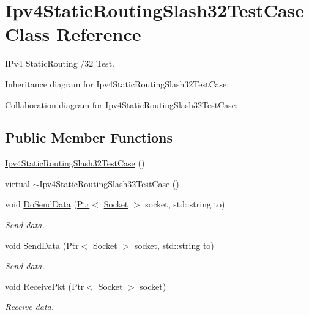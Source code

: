 \hypertarget{classIpv4StaticRoutingSlash32TestCase}{}\section{Ipv4\+Static\+Routing\+Slash32\+Test\+Case Class Reference}
\label{classIpv4StaticRoutingSlash32TestCase}


I\+Pv4 Static\+Routing /32 Test.  




Inheritance diagram for Ipv4\+Static\+Routing\+Slash32\+Test\+Case\+:


Collaboration diagram for Ipv4\+Static\+Routing\+Slash32\+Test\+Case\+:
\subsection*{Public Member Functions}
\begin{DoxyCompactItemize}
\item 
\hyperlink{classIpv4StaticRoutingSlash32TestCase_a933154d0475b7d7adbd5bb585c1a8ac0}{Ipv4\+Static\+Routing\+Slash32\+Test\+Case} ()
\item 
virtual \hyperlink{classIpv4StaticRoutingSlash32TestCase_ab1d9f4008b2e22b1d427d1c98e3f4409}{$\sim$\+Ipv4\+Static\+Routing\+Slash32\+Test\+Case} ()
\item 
void \hyperlink{classIpv4StaticRoutingSlash32TestCase_ab4b414634c2b2f84f81faef3f03cfcf4}{Do\+Send\+Data} (\hyperlink{classns3_1_1Ptr}{Ptr}$<$ \hyperlink{classns3_1_1Socket}{Socket} $>$ socket, std\+::string to)
\begin{DoxyCompactList}\small\item\em Send data. \end{DoxyCompactList}\item 
void \hyperlink{classIpv4StaticRoutingSlash32TestCase_a172a790340fdce3fef1e07e5e35b2e8a}{Send\+Data} (\hyperlink{classns3_1_1Ptr}{Ptr}$<$ \hyperlink{classns3_1_1Socket}{Socket} $>$ socket, std\+::string to)
\begin{DoxyCompactList}\small\item\em Send data. \end{DoxyCompactList}\item 
void \hyperlink{classIpv4StaticRoutingSlash32TestCase_a50319504994176603f9c117f815e82aa}{Receive\+Pkt} (\hyperlink{classns3_1_1Ptr}{Ptr}$<$ \hyperlink{classns3_1_1Socket}{Socket} $>$ socket)
\begin{DoxyCompactList}\small\item\em Receive data. \end{DoxyCompactList}\end{DoxyCompactItemize}
